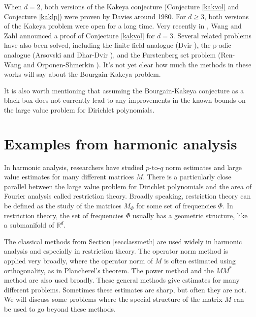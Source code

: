 \documentclass{amsart}
\newcommand{\Poly}{\textrm{Poly}}
\newcommand{\RR}{\mathbb{R}}
\begin{document}
When $d=2$,  both versions of the Kakeya conjecture (Conjecture \ref{kakvol} and Conjecture \ref{kaklp}) were proven by Davies around 1980.  
For $d \ge 3$,  both versions of the Kakeya problem were open for a long time.   Very recently in \cite{WZ},  Wang and Zahl announced a proof of Conjecture \ref{kakvol} for $d=3$.   Several related problems have also been solved,  including the finite field analogue (Dvir \cite{D}),  the p-adic analogue (Arsovski \cite{A} and Dhar-Dvir \cite{DD}),  and the Furstenberg set problem (Ren-Wang \cite{RW} and Orponen-Shmerkin \cite{OS}).  
It's not yet clear how much the methods in these works will say about the Bourgain-Kakeya problem.   

It is also worth mentioning that assuming the Bourgain-Kakeya conjecture as a black box does not currently lead to any improvements in the known bounds on the large value problem for Dirichlet polynomials.



\section{Examples from harmonic analysis} \label{secharmanal}

In harmonic analysis,  researchers have studied $p$-to-$q$ norm estimates and large value estimates for many different matrices $M$.   
There is a particularly close parallel between the large value problem for Dirichlet polynomials and the area of Fourier analysis called restriction theory.  Broadly speaking, restriction theory can be defined as the study of the matrices $M_\Phi$ for some set of frequencies $\Phi$.  In restriction theory, the set of frequencies $\Phi$ usually has a geometric structure, like a submanifold of $\RR^d$.

The classical methods from Section \ref{secclassmeth} are used widely in harmonic analysis and especially in restriction theory.  
The operator norm method is applied very broadly, where the operator norm of $M$ is often estimated using orthogonality, as in Plancherel's theorem.  The power method and the $M M^*$ method are also used broadly.  These general methods give estimates for many different problems.  Sometimes these estimates are sharp, but often they are not.  We will discuss some problems where the special structure of the matrix $M$ can be used to go beyond these methods.  %
\end{document}
